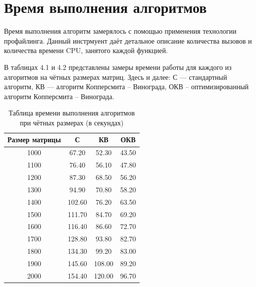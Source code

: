 \documentclass[12pt]{report}
\begin{document}
\section{Время выполнения алгоритмов}
Время выполнения алгоритм замерялось с помощью применения технологии профайлинга. Данный инстрмуент даёт детальное описание количества вызовов и количества времени CPU, занятого каждой функцией. \newline

В таблицах 4.1 и 4.2 представлены замеры времени работы для каждого из алгоритмов на чётных размерах матриц. Здесь и далее: С — стандартный алгоритм, КВ — алгоритм Копперсмита -- Винограда, ОКВ -- оптимизированный алгоритм Копперсмита -- Винограда.

\begin{table} [h!]
	\caption{Таблица времени выполнения алгоритмов при чётных размерах (в секундах)}
	\begin{center}
		\begin{tabular}{|c c c c|} 
		 	\hline
			Размер матрицы & С & КВ & ОКВ \\  
			\hline
            1000 & 67.20 & 52.30 & 43.50  \\ 
            \hline
            1100 & 76.40 & 56.10 & 47.80  \\ 
            \hline
            1200 & 87.30 & 68.50 & 56.20  \\ 
            \hline
            1300 & 94.90 & 70.80 & 58.20  \\ 
            \hline
            1400 & 102.60 & 76.20 & 63.50  \\ 
            \hline
            1500 & 111.70 & 84.70 & 69.20  \\ 
            \hline
            1600 & 116.40 & 86.60 & 72.70  \\ 
            \hline
            1700 & 128.80 & 93.80 & 82.70  \\ 
            \hline
            1800 & 134.30 & 99.20 & 83.00  \\ 
            \hline
            1900 & 145.60 & 108.00 & 89.20  \\ 
            \hline
            2000 & 154.40 & 120.00 & 96.70  \\ 
            \hline
		\end{tabular}
	\end{center}
\end{table}
\end{document}
